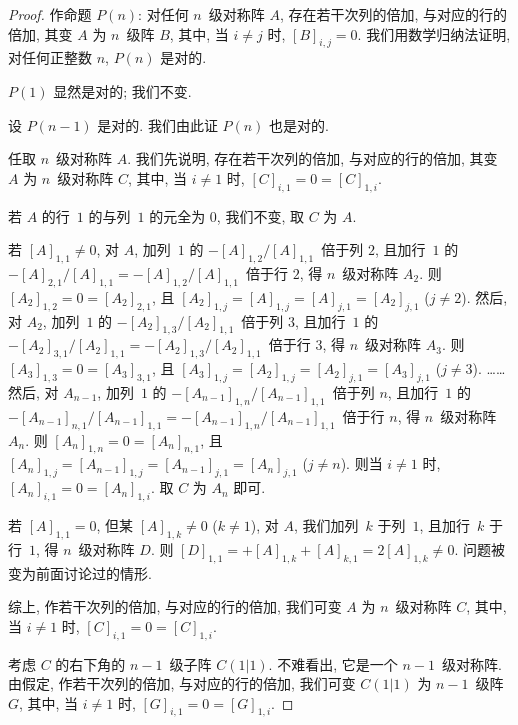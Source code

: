 \documentclass[../libro.tex]{subfiles}
\begin{document}
\begin{proof}
    作命题 \(P(n)\):
    对任何 \(n\)~级对称阵 \(A\),
    存在若干次列的倍加, 与对应的行的倍加,
    其变 \(A\) 为 \(n\)~级阵 \(B\),
    其中, 当 \(i \neq j\) 时, \([B]_{i,j} = 0\).
    我们用数学归纳法证明,
    对任何正整数 \(n\), \(P(n)\) 是对的.

    \(P(1)\) 显然是对的;
    我们不变.

    设 \(P(n-1)\) 是对的.
    我们由此证 \(P(n)\) 也是对的.

    任取 \(n\)~级对称阵 \(A\).
    我们先说明,
    存在若干次列的倍加, 与对应的行的倍加,
    其变 \(A\) 为 \(n\)~级对称阵 \(C\),
    其中, 当 \(i \neq 1\) 时, \([C]_{i,1} = 0 = [C]_{1,i}\).

    若 \(A\) 的行~\(1\) 的与列~\(1\) 的元全为 \(0\),
    我们不变, 取 \(C\) 为 \(A\).

    若 \([A]_{1,1} \neq 0\),
    对 \(A\),
    加列~\(1\) 的 \(-[A]_{1,2}/[A]_{1,1}\)~倍于列 \(2\),
    且加行~\(1\) 的 \(-[A]_{2,1}/[A]_{1,1}
    = -[A]_{1,2}/[A]_{1,1}\)~倍于行 \(2\),
    得 \(n\)~级对称阵 \(A_2\).
    则 \([A_2]_{1,2} = 0 = [A_2]_{2,1}\),
    且 \([A_2]_{1,j} = [A]_{1,j}
    = [A]_{j,1} = [A_2]_{j,1}\)
    (\(j \neq 2\)).
    然后, 对 \(A_2\),
    加列~\(1\) 的 \(-[A_2]_{1,3}/[A_2]_{1,1}\)~倍于列 \(3\),
    且加行~\(1\) 的 \(-[A_2]_{3,1}/[A_2]_{1,1}
    = -[A_2]_{1,3}/[A_2]_{1,1}\)~倍于行 \(3\),
    得 \(n\)~级对称阵 \(A_3\).
    则 \([A_3]_{1,3} = 0 = [A_3]_{3,1}\),
    且 \([A_3]_{1,j} = [A_2]_{1,j}
    = [A_2]_{j,1} = [A_3]_{j,1}\)
    (\(j \neq 3\)).
    ……
    然后, 对 \(A_{n-1}\),
    加列~\(1\) 的 \(-[A_{n-1}]_{1,n}/[A_{n-1}]_{1,1}\)~倍于列 \(n\),
    且加行~\(1\) 的 \(-[A_{n-1}]_{n,1}/[A_{n-1}]_{1,1}
    = -[A_{n-1}]_{1,n}/[A_{n-1}]_{1,1}\)~倍于行 \(n\),
    得 \(n\)~级对称阵 \(A_n\).
    则 \([A_n]_{1,n} = 0 = [A_n]_{n,1}\),
    且 \([A_n]_{1,j} = [A_{n-1}]_{1,j}
    = [A_{n-1}]_{j,1} = [A_n]_{j,1}\)
    (\(j \neq n\)).
    则当 \(i \neq 1\) 时,
    \([A_n]_{i,1} = 0 = [A_n]_{1,i}\).
    取 \(C\) 为 \(A_n\) 即可.

    若 \([A]_{1,1} = 0\), 但某 \([A]_{1,k} \neq 0\)
    (\(k \neq 1\)),
    对 \(A\),
    我们加列~\(k\) 于列~\(1\),
    且加行~\(k\) 于行~\(1\),
    得 \(n\)~级对称阵 \(D\).
    则 \([D]_{1,1} =  + [A]_{1,k} + [A]_{k,1}
    = 2 [A]_{1,k} \neq 0\).
    问题被变为前面讨论过的情形.

    综上, 作若干次列的倍加, 与对应的行的倍加,
    我们可变 \(A\) 为 \(n\)~级对称阵 \(C\),
    其中, 当 \(i \neq 1\) 时, \([C]_{i,1} = 0 = [C]_{1,i}\).

    考虑 \(C\) 的右下角的 \(n-1\)~级子阵 \(C(1|1)\).
    不难看出, 它是一个 \(n-1\)~级对称阵.
    由假定,
    作若干次列的倍加, 与对应的行的倍加,
    我们可变 \(C(1|1)\) 为 \(n-1\)~级阵 \(G\),
    其中, 当 \(i \neq 1\) 时, \([G]_{i,1} = 0 = [G]_{1,i}\).


\end{proof}
\end{document}
